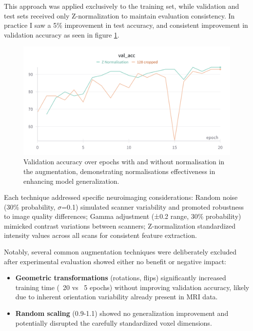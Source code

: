 \documentclass[12pt, a4paper]{article}
\begin{document}
This approach was applied exclusively to the training set, while validation and test sets received only Z-normalization to maintain evaluation consistency. In practice I saw a 5\% improvement in test accuracy, and consistent improvement in validation accuracy as seen in figure \ref{fig:normalisation_accuracy}.
\begin{figure}[htbp]
  \centering
  \includegraphics[width=\textwidth]{figures/normalisation_accuracy.png}
  \caption{Validation accuracy over epochs with and without normalisation in the augmentation, demonstrating normalisations effectiveness in enhancing model generalization.}
  \label{fig:normalisation_accuracy}
\end{figure}

Each technique addressed specific neuroimaging considerations: Random noise (30\% probability, $\sigma$=0.1) simulated scanner variability and promoted robustness to image quality differences; Gamma adjustment (±0.2 range, 30\% probability) mimicked contrast variations between scanners; Z-normalization standardized intensity values across all scans for consistent feature extraction.

Notably, several common augmentation techniques were deliberately excluded after experimental evaluation showed either no benefit or negative impact:

\begin{itemize}
    \item \textbf{Geometric transformations} (rotations, flips) significantly increased training time (~20 vs ~5 epochs) without improving validation accuracy, likely due to inherent orientation variability already present in MRI data.
    
    \item \textbf{Random scaling} (0.9-1.1) showed no generalization improvement and potentially disrupted the carefully standardized voxel dimensions.
\end{itemize}
\end{document}

